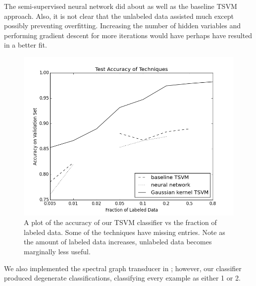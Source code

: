 \documentclass[11pt]{article}
\begin{document}
The semi-supervised neural network did about as well as the baseline TSVM approach. Also, it is not clear that the unlabeled data assisted much except possibly preventing overfitting. Increasing the number of hidden variables and performing gradient descent for more iterations would have perhaps have resulted in a better fit.

\begin{figure}
  \centering
  \includegraphics[width=5in]{figure_1.png}
  \caption{A plot of the accuracy of our TSVM classifier vs the fraction of labeled data. Some of the techniques have missing entries. Note as the amount of labeled data increases, unlabeled data becomes marginally less useful.}
\end{figure}

We also implemented the spectral graph transducer in \cite{joachims2003transductive}; however, our classifier
produced degenerate classifications, classifying every example as either 1 or 2.
\end{document}
